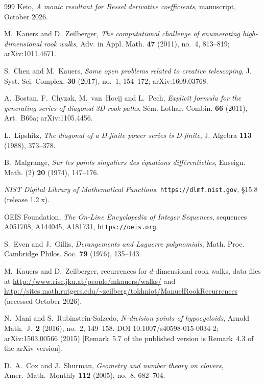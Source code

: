 \documentclass[11pt]{amsart}
\theoremstyle{definition}
\theoremstyle{remark}
\begin{document}
\begin{thebibliography}{999}
 Keio, \emph{A monic resultant for Bessel derivative coefficients}, manuscript, October 2026.

M.~Kauers and D.~Zeilberger,
\emph{The computational challenge of enumerating high-dimensional rook walks},
Adv. in Appl. Math. \textbf{47} (2011), no.~4, 813--819; arXiv:1011.4671.

S.~Chen and M.~Kauers,
\emph{Some open problems related to creative telescoping},
J. Syst. Sci. Complex. \textbf{30} (2017), no.~1, 154--172; arXiv:1609.03768.

A.~Bostan, F.~Chyzak, M.~van~Hoeij and L.~Pech,
\emph{Explicit formula for the generating series of diagonal 3D rook paths},
S\'em. Lothar. Combin. \textbf{66} (2011), Art.~B66a; arXiv:1105.4456.

L.~Lipshitz,
\emph{The diagonal of a D-finite power series is D-finite},
J. Algebra \textbf{113} (1988), 373--378.

B.~Malgrange,
\emph{Sur les points singuliers des \'equations diff\'erentielles},
Enseign. Math. (2) \textbf{20} (1974), 147--176.

\emph{NIST Digital Library of Mathematical Functions}, \texttt{https://dlmf.nist.gov}, \S15.8
(release 1.2.x).

OEIS Foundation, \emph{The On-Line Encyclopedia of Integer Sequences}, sequences
A051708, A144045, A181731, \texttt{https://oeis.org}.

S.~Even and J.~Gillis,
\emph{Derangements and Laguerre polynomials},
Math. Proc. Cambridge Philos. Soc. \textbf{79} (1976), 135--143.

M.~Kauers and D.~Zeilberger, recurrences for $d$-dimensional rook walks, data files at
\url{http://www.risc.jku.at/people/mkauers/walks/} and
\url{http://sites.math.rutgers.edu/~zeilberg/tokhniot/ManuelRookRecurrences} (accessed October 2026).

N.~Mani and S.~Rubinstein-Salzedo,
\emph{$N$-division points of hypocycloids},
Arnold Math.\ J.\ \textbf{2} (2016), no.~2, 149--158.
DOI 10.1007/s40598-015-0034-2; arXiv:1503.00566 (2015)
[Remark~5.7 of the published version is Remark~4.3 of the arXiv version].

D.~A.~Cox and J.~Shurman,
\emph{Geometry and number theory on clovers},
Amer.\ Math.\ Monthly \textbf{112} (2005), no.~8, 682--704.


\end{thebibliography}
\end{document}

